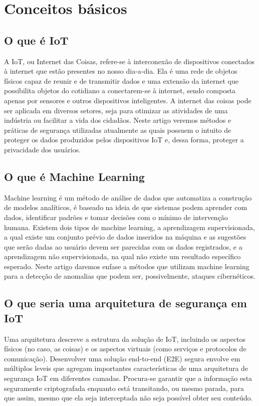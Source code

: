 \documentclass[article,12pt]{abntex2}
\begin{document}
\section{Conceitos básicos}
\subsection{O que é IoT}
A IoT, ou Internet das Coisas, refere-se à interconexão de dispositivos conectados à internet que estão presentes no nosso dia-a-dia. Ela é uma rede de objetos físicos capaz de reunir e de transmitir dados e uma extensão da internet que possibilita objetos do cotidiano a conectarem-se à internet, sendo composta apenas por sensores e outros dispositivos inteligentes. A internet das coisas pode ser aplicada em diversos setores, seja para otimizar as atividades de uma indústria ou facilitar a vida dos cidadãos. Neste artigo veremos métodos e práticas de segurança utilizadas atualmente as quais possuem o intuito de proteger os dados produzidos pelos dispositivos IoT e, dessa forma, proteger a privacidade dos usuários.
\subsection{O que é Machine Learning}
Machine learning é um método de análise de dados que automatiza a construção de modelos analíticos, é baseado na ideia de que sistemas podem aprender com dados, identificar padrões e tomar decisões com o mínimo de intervenção humana. Existem dois tipos de machine learning, a aprendizagem supervisionada, a qual existe um conjunto prévio de dados inseridos na máquina e as sugestões que serão dadas ao usuário devem ser parecidas com os dados registrados, e a aprendizagem não supervisionada, na qual não existe um resultado específico esperado. Neste artigo daremos enfase a métodos que utilizam machine learning para a detecção de anomalias que podem ser, possivelmente, ataques cibernéticos.
\subsection{O que seria uma arquitetura de segurança em IoT}
Uma arquitetura descreve a estrutura da solução de IoT, incluindo os aspectos físicos (no caso, as coisas) e os aspectos virtuais (como serviços e protocolos de comunicação). Desenvolver uma solução end-to-end (E2E) segura envolve em múltiplos leveis que agregam importantes características de uma arquitetura de segurança IoT em diferentes camadas. Procura-se garantir que a informação esta seguramente criptografada enquanto está transitando, ou mesmo parada, para que assim, mesmo que ela seja interceptada não seja possível obter seu conteúdo.
\end{document}
